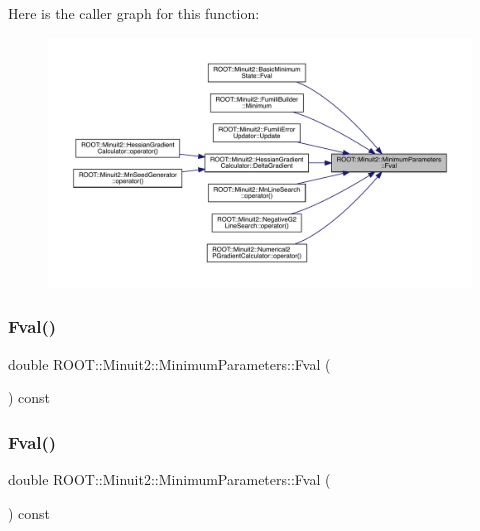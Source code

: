 Here is the caller graph for this function\+:
\nopagebreak
\begin{figure}[H]
\begin{center}
\leavevmode
\includegraphics[width=350pt]{db/db8/classROOT_1_1Minuit2_1_1MinimumParameters_a1f9cd63f5947771e367bedd4dafa54e3_icgraph}
\end{center}
\end{figure}
\mbox{\label{classROOT_1_1Minuit2_1_1MinimumParameters_a1f9cd63f5947771e367bedd4dafa54e3}} 
\subsubsection{\texorpdfstring{Fval()}{Fval()}\hspace{0.1cm}{\footnotesize\ttfamily [2/3]}}
{\footnotesize\ttfamily double R\+O\+O\+T\+::\+Minuit2\+::\+Minimum\+Parameters\+::\+Fval (\begin{DoxyParamCaption}{ }\end{DoxyParamCaption}) const\hspace{0.3cm}{\ttfamily [inline]}}

\mbox{\label{classROOT_1_1Minuit2_1_1MinimumParameters_a1f9cd63f5947771e367bedd4dafa54e3}} 
\subsubsection{\texorpdfstring{Fval()}{Fval()}\hspace{0.1cm}{\footnotesize\ttfamily [3/3]}}
{\footnotesize\ttfamily double R\+O\+O\+T\+::\+Minuit2\+::\+Minimum\+Parameters\+::\+Fval (\begin{DoxyParamCaption}{ }\end{DoxyParamCaption}) const\hspace{0.3cm}{\ttfamily [inline]}}

